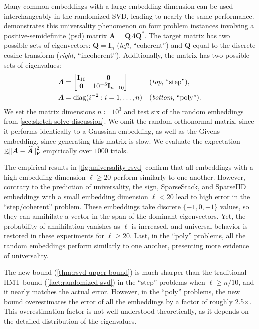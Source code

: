 \documentclass[11pt]{article}
\DeclareMathOperator{\diag}{diag}
\newcommand{\mat}[1]{\boldsymbol{#1}}
\newcommand{\norm}[1]{\mleft\| #1 \mright\|}
\newcommand{\Id}{\mathbf{I}}
\newcommand{\twobytwo}[4]{%
  \begin{bmatrix}#1 & #2 \\ #3 & #4\end{bmatrix}}
\DeclareMathOperator{\expect}{\mathbb{E}}
\newcommand{\hatbold}[1]{%
  \skew{4}\widehat{\smash{\boldsymbol{#1}}\mathstrut}}
\newcommand{\Ahat}{\smash{\hatbold{A}}}
\theoremstyle{definition}
\numberwithin{equation}{section}
\begin{document}
Many common embeddings with a large embedding dimension can be used interchangeably in the randomized SVD, leading to nearly the same performance.
 demonstrates this universality phenomenon on four problem instances involving a positive-semidefinite (psd) matrix $\mat{A} = \mat{Q}\mat{\varLambda}\mat{Q}^*$.
The target matrix has two possible sets of eigenvectors: $\mat{Q} = \Id_n$ (\emph{left}, ``coherent'') and $\mat{Q}$ equal to the discrete cosine transform (\emph{right}, ``incoherent'').
Additionally, the matrix has two possible sets of eigenvalues:
%
\begin{align*}
    \mat{\varLambda} &= \twobytwo{\Id_{10}}{\mat{0}}{\mat{0}}{10^{-5}\Id_{n-10}} &&
    \text{(\emph{top}, ``step'')}, \\
    \mat{\varLambda} &= \diag(i^{-2} : i=1,\ldots,n) && \text{(\emph{bottom}, ``poly'')}.
\end{align*}
%
We set the matrix dimensions $n\coloneqq 10^3$ and test six of the random embeddings from \cref{sec:sketch-solve-discussion}.
We omit the random orthonormal matrix, since it performs identically to a Gaussian embedding, as well as the Givens embedding, since generating this matrix is slow.
We evaluate the expectation $\expect \norm{\mat{A} - \Ahat}_{\rm F}^2$ empirically over $1000$ trials.

The empirical results in \cref{fig:universality-rsvd} confirm that all embeddings with a high embedding dimension $\ell \geq 20$ perform similarly to one another.
However, contrary to the prediction of universality, the sign, SparseStack, and SparseIID embeddings with a small embedding dimension $\ell < 20$ lead to high error in the ``step/coherent'' problem.
These embeddings take discrete $\{-1,0,+1\}$ values, so they can annihilate a vector in the span of the dominant eigenvectors.
Yet, the probability of annihilation vanishes as $\ell$ is increased, and universal behavior is restored in these experiments for $\ell \ge 20$.
Last, in the ``poly'' problems, all the random embeddings perform similarly to one another, presenting more evidence of universality.

The new bound (\cref{thm:rsvd-upper-bound}) is much sharper than the traditional HMT bound (\cref{fact:randomized-svd}) in the ``step'' problems when $\ell \geq n / 10$, and it nearly matches the actual error.
However, in the ``poly'' problems, the new bound overestimates the error of all the embeddings by a factor of roughly 2.5$\times$.
This overestimation factor is not well understood theoretically, as it depends on the detailed distribution of the eigenvalues.
\end{document}
